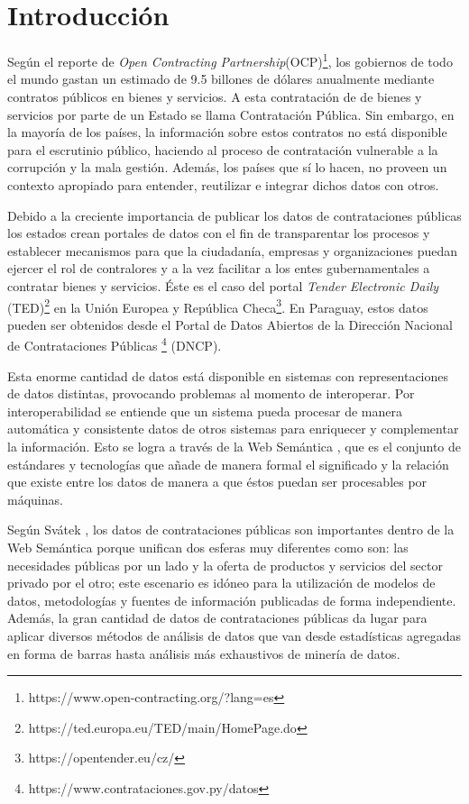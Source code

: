 \chapter{Introducción}
\label{chap:introduccion}




Según el reporte de \textit{Open Contracting Partnership}(OCP)\footnote{https://www.open-contracting.org/?lang=es}, los gobiernos de todo el mundo gastan un estimado de 9.5 billones de dólares anualmente mediante contratos públicos en bienes y servicios. A esta contratación de de bienes y servicios por parte de un Estado se llama Contratación Pública.  Sin embargo, en la mayoría de los países, la información sobre estos contratos no está disponible para el escrutinio público, haciendo al proceso de contratación vulnerable a la corrupción y la mala gestión. Además, los países que sí lo hacen, no proveen un contexto apropiado para entender, reutilizar e integrar dichos datos con otros.

Debido a la creciente importancia de publicar los datos de contrataciones públicas los estados crean portales de datos con el fin de transparentar los procesos y establecer mecanismos para que la ciudadanía, empresas y organizaciones puedan ejercer el rol de contralores y a la vez facilitar a los entes gubernamentales a contratar bienes y servicios. Éste es el caso del portal \textit{Tender Electronic Daily} (TED)\footnote{https://ted.europa.eu/TED/main/HomePage.do}  en la Unión Europea y República Checa\footnote{https://opentender.eu/cz/}. En Paraguay, estos datos pueden ser obtenidos desde el Portal de Datos Abiertos de la Dirección Nacional de Contrataciones Públicas \footnote{https://www.contrataciones.gov.py/datos} (DNCP).

Esta enorme cantidad de datos está disponible en sistemas con representaciones de datos distintas, provocando problemas al momento de interoperar. Por interoperabilidad se entiende que un sistema pueda procesar de manera automática y consistente datos de otros sistemas para enriquecer y complementar la información. Esto se logra a través de la Web Semántica \cite{Semantic20:online}, que es el conjunto de estándares y tecnologías que añade de manera formal el significado y la relación que existe entre los datos de manera a que éstos puedan ser procesables por máquinas.

Según Svátek \cite{svatek2014linked}, los datos de contrataciones públicas son importantes dentro de la Web Semántica \cite{Semantic20:online} porque unifican dos esferas muy diferentes como son: las necesidades públicas por un lado y la oferta de productos y servicios del sector privado por el otro; este escenario es idóneo para la utilización de modelos de datos, metodologías y fuentes de información publicadas de forma independiente. Además, la gran cantidad de datos de contrataciones públicas da lugar para aplicar diversos métodos de análisis de datos que van desde estadísticas agregadas en forma de barras hasta análisis más exhaustivos de minería de datos.



